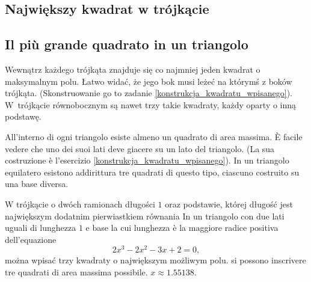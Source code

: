 %

\subsection{Największy kwadrat w trójkącie} %
\subsection{Il più grande quadrato in un triangolo} %


Wewnątrz każdego trójkąta znajduje się co najmniej jeden kwadrat o maksymalnym polu. %
Łatwo widać, że jego bok musi leżeć na którymś z boków trójkąta. %
(Skonstruowanie go to zadanie \ref{konstrukcja_kwadratu_wpisanego}). %
W~trójkącie równobocznym są nawet trzy takie kwadraty, każdy oparty o inną podstawę. %

All'interno di ogni triangolo esiste almeno un quadrato di area massima. %
È facile vedere che uno dei suoi lati deve giacere su un lato del triangolo. %
(La sua costruzione è l'esercizio \ref{konstrukcja_kwadratu_wpisanego}). %
In un triangolo equilatero esistono addirittura tre quadrati di questo tipo, ciascuno costruito su una base diversa. %

\begin{proposition}
\label{trojkat_calabiego}%
    W trójkącie o dwóch ramionach długości $1$ oraz podstawie, której długość jest największym dodatnim pierwiastkiem równania %
    In un triangolo con due lati uguali di lunghezza $1$ e base la cui lunghezza è la maggiore radice positiva dell'equazione %
    \begin{equation}
        2x^3 - 2x^2 - 3x + 2 = 0,
    \end{equation}
    można wpisać trzy kwadraty o największym możliwym polu. %
    si possono inscrivere tre quadrati di area massima possibile. %
    $x \approx 1.55138$.
\end{proposition}

